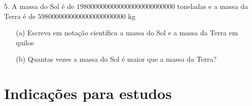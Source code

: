 \documentclass[a4paper,12pt]{article}
\begin{document}
	\hfill
	 
	5. A massa do Sol é de $1 980 000 000 000 000 000 000 000 000$ toneladas e a massa da Terra é de $5 980 000 000 000 000 000 000 000$ kg
	\begin{enumerate}
		\item[(a)] Escreva em notação científica a massa do Sol e a massa da Terra em quilos
		\item[(b)] Quantas vezes a massa do Sol é maior que a massa da Terra?
	\end{enumerate}
	
	\newpage
	
	\section*{Indicações para estudos}
	
\end{document}

